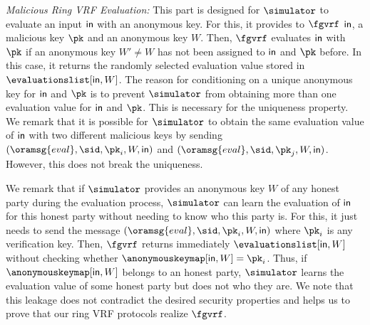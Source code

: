 \smallskip
	\noindent \textit{Malicious Ring VRF Evaluation:} This part is designed for $ \simulator $ to evaluate an input $ \mathsf{in} $ with an anonymous key. For this,  it  provides to $ \fgvrf $  $ \mathsf{in} $, a malicious key $ \pk $ and an anonymous key $ W $.  Then, $ \fgvrf $ evaluates  $ \mathsf{in} $ with $ \pk $ if an anonymous key $ W' \neq W$  has not been assigned to $ \mathsf{in} $ and $ \pk $ before.  In this case, it returns the randomly selected evaluation value stored  in $ \evaluationslist[\msg, W] $. The reason for conditioning on a unique anonymous key for $ \mathsf{in} $ and $ \pk $ is to prevent $ \simulator $ from obtaining more than one evaluation value for $ \mathsf{in} $ and $ \pk $. This is necessary for the uniqueness property.
We remark that it is possible  for $ \simulator $ to  obtain the same evaluation value of $ \mathsf{in} $ with two different malicious  keys 
by sending $ (\oramsg{eval}, \sid, \pk_i, W, \msg) $ and $(\oramsg{eval}, \sid, \pk_j, W, \msg)$. However, this does not break the uniqueness.


We remark that if $ \simulator $ provides an anonymous key $ W $ of any honest party during  the evaluation process,  $ \simulator $ can learn the  evaluation of  $ \mathsf{in} $ for this honest party without needing to know who this party is. For this, it just needs to send the message $ (\oramsg{eval}, \sid, \pk_i,W,\msg) $ where $ \pk_i $ is any  verification key. Then, $ \fgvrf $  returns immediately $ \evaluationslist[\msg, W] $ without checking whether $ \anonymouskeymap[\msg,W] = \pk_i $. Thus, if   $ \anonymouskeymap[\msg,W]  $ belongs to an honest party, $ \simulator $ learns the evaluation value of some honest party but does not who they are. We note that this leakage does not contradict the desired security properties and helps us to prove that our ring VRF protocols realize $ \fgvrf $.  

